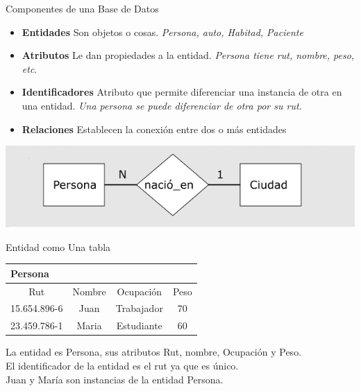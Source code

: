 \documentclass[11pt]{beamer}
\begin{document}
\begin{frame}{Componentes de una Base de Datos}
\begin{itemize}

\item \textbf{Entidades} Son objetos o cosas. \textit{Persona, auto, Habitad, Paciente}

\item \textbf{Atributos} Le dan propiedades a la entidad. \textit{Persona tiene rut, nombre, peso, etc}.

\item \textbf{Identificadores} Atributo que permite diferenciar una instancia de otra en una entidad. \textit{Una persona se puede diferenciar de otra por su rut.}

\item  \textbf{Relaciones} Establecen la conexión entre dos o más entidades

\end{itemize}


\begin{center}
\includegraphics[scale=0.5]{images/rel.png} 
\end{center}


\end{frame}


\begin{frame}{Entidad como Una tabla}
\begin{table}[!H]
\begin{tabular}{|c|c|c|c|}
\hline
\multicolumn{4}{|l|}{Persona} \\ \hline
\hline 
Rut & Nombre & Ocupación & Peso \\ 
\hline 
15.654.896-6 & Juan & Trabajador & 70 \\ 
\hline 
23.459.786-1 & Maria & Estudiante & 60 \\ 
\hline 
\end{tabular} 
\end{table}

La entidad es Persona, sus atributos Rut, nombre, Ocupación y Peso.\\
El identificador de la entidad es el rut ya que es único.\\
Juan y María son instancias de la entidad Persona.\\

\end{frame}
\end{document}
